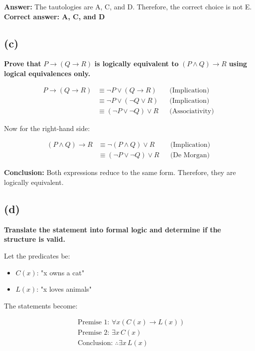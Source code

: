 \documentclass{article}
\begin{document}
\textbf{Answer:} The tautologies are A, C, and D.  
Therefore, the correct choice is not E.  
\textbf{Correct answer: A, C, and D}

\subsection*{(c)}

\textbf{Prove that } \(P \rightarrow (Q \rightarrow R)\) \textbf{ is logically equivalent to } \((P \land Q) \rightarrow R\) \textbf{ using logical equivalences only.}

\begin{align*}
P \rightarrow (Q \rightarrow R)
&\equiv \neg P \lor (Q \rightarrow R) && \text{(Implication)} \\
&\equiv \neg P \lor (\neg Q \lor R) && \text{(Implication)} \\
&\equiv (\neg P \lor \neg Q) \lor R && \text{(Associativity)}
\end{align*}

Now for the right-hand side:

\begin{align*}
(P \land Q) \rightarrow R
&\equiv \neg (P \land Q) \lor R && \text{(Implication)} \\
&\equiv (\neg P \lor \neg Q) \lor R && \text{(De Morgan)}
\end{align*}

\textbf{Conclusion:} Both expressions reduce to the same form.  
Therefore, they are logically equivalent.

\subsection*{(d)}

\textbf{Translate the statement into formal logic and determine if the structure is valid.}

Let the predicates be:

\begin{itemize}
  \item \(C(x)\): "x owns a cat"
  \item \(L(x)\): "x loves animals"
\end{itemize}

The statements become:

\begin{align*}
&\text{Premise 1: } \forall x (C(x) \rightarrow L(x)) \\
&\text{Premise 2: } \exists x \, C(x) \\
&\text{Conclusion: } \therefore \exists x \, L(x)
\end{align*}
\end{document}
